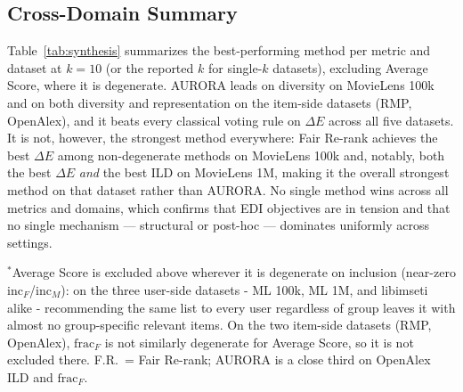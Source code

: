 \documentclass[a4paper,fleqn]{cas-dc}
\begin{document}
\subsection{Cross-Domain Summary}

Table~\ref{tab:synthesis} summarizes the best-performing method per
metric and dataset at $k=10$ (or the reported $k$ for single-$k$
datasets), excluding Average Score, where it is degenerate. AURORA leads
on diversity on MovieLens 100k and on both diversity and representation
on the item-side datasets (RMP, OpenAlex), and it beats every classical
voting rule on $\Delta E$ across all five datasets. It is not, however,
the strongest method everywhere: Fair Re-rank achieves the best $\Delta
E$ among non-degenerate methods on MovieLens 100k and, notably, both the
best $\Delta E$ \emph{and} the best ILD on MovieLens 1M, making it the
overall strongest method on that dataset rather than AURORA. No single
method wins across all metrics and domains, which confirms that EDI
objectives are in tension and that no single mechanism — structural or
post-hoc — dominates uniformly across settings.

\begin{table}[h!]
\caption{Cross-domain summary: best method per metric at $k=10$ (or the
single reported $k$ for libimseti, RMP, OpenAlex).}
\label{tab:synthesis}
\centering
\footnotesize
{}
\par\smallskip
\footnotesize $^*$Average Score is excluded above wherever it is
degenerate on inclusion (near-zero $\mathrm{inc}_F$/$\mathrm{inc}_M$): on
the three user-side datasets - ML 100k, ML 1M, and libimseti alike -
recommending the same list to every user regardless of group leaves it
with almost no group-specific relevant items. On the two item-side
datasets (RMP, OpenAlex), $\mathrm{frac}_F$ is not similarly degenerate for
Average Score, so it is not excluded there. F.R.\ = Fair Re-rank; AURORA
is a close third on OpenAlex ILD and $\mathrm{frac}_F$.
\end{table}
\end{document}
